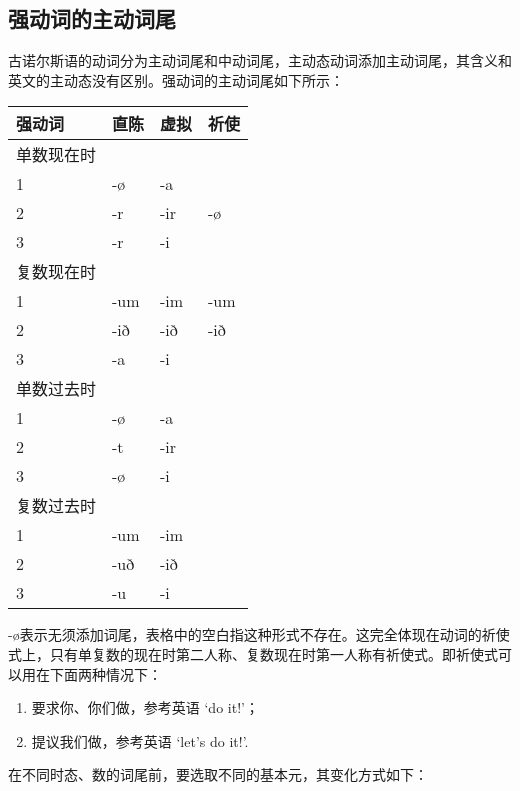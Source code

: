 \subsection{强动词的主动词尾}\label{强动词的主动词尾}

古诺尔斯语的动词分为主动词尾和中动词尾，主动态动词添加主动词尾，其含义和英文的主动态没有区别。强动词的主动词尾如下所示：

\begin{longtable}{llll}
  \toprule
  强动词   & 直陈  & 虚拟  & 祈使  \\
  \midrule
  \endhead
  \bottomrule
  \endfoot
  单数现在时 &     &     &     \\
  1     & -ø  & -a  &     \\
  2     & -r  & -ir & -ø  \\
  3     & -r  & -i  &     \\
  复数现在时 &     &     &     \\
  1     & -um & -im & -um \\
  2     & -ið & -ið & -ið \\
  3     & -a  & -i  &     \\
  单数过去时 &     &     &     \\
  1     & -ø  & -a  &     \\
  2     & -t  & -ir &     \\
  3     & -ø  & -i  &     \\
  复数过去时 &     &     &     \\
  1     & -um & -im &     \\
  2     & -uð & -ið &     \\
  3     & -u  & -i  &     \\
\end{longtable}

-ø表示无须添加词尾，表格中的空白指这种形式不存在。这完全体现在动词的祈使式上，只有单复数的现在时第二人称、复数现在时第一人称有祈使式。即祈使式可以用在下面两种情况下：

\begin{enumerate}
  \def\labelenumi{\arabic{enumi})}
  \item
        要求你、你们做，参考英语 `do it!'；
  \item
        提议我们做，参考英语 `let's do it!'.
\end{enumerate}

在不同时态、数的词尾前，要选取不同的基本元，其变化方式如下：

